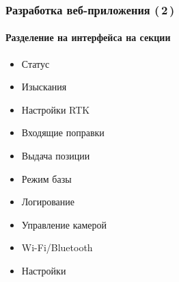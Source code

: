 \documentclass[xetex,с,aspectratio=169]{beamer}
\begin{document}

%
%
\begin{frame}
  \frametitle{Разработка веб-приложения (\,2\,)}
  \framesubtitle{Разделение на интерфейса на секции}

  \begin{minipage}[c]{\textwidth}
    \centering
    \footnotesize
    \vskip -1cm
    \begin{minipage}[b]{.32\textwidth}
      \begin{itemize}
        \item<1> Статус
        \item<2> Изыскания
        \item<3> Настройки RTK
        \item<4> Входящие поправки
        \item<5> Выдача позиции
        \item<6> Режим базы
        \item<7> Логирование
        \item<8> Управление камерой
        \item<9> Wi-Fi/Bluetooth
        \item<10> Настройки
      \end{itemize}
    \end{minipage}
    \hspace{1em}
    \begin{minipage}[b]{.64\textwidth}
      \vskip 1cm
\end{minipage}
\end{minipage}
\end{frame}
\end{document}
